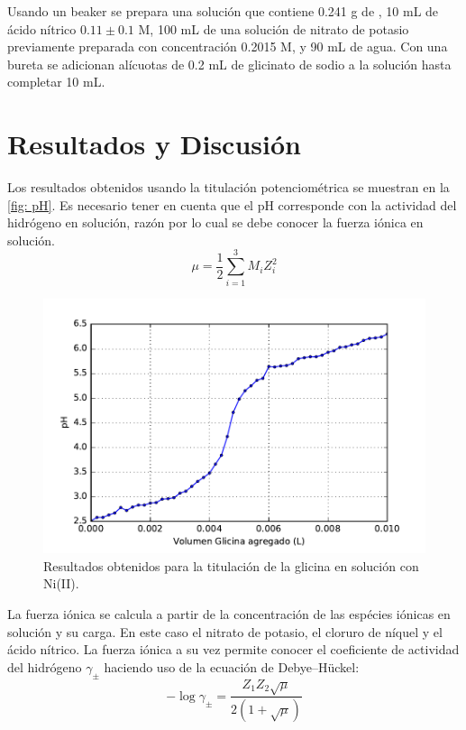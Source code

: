 \documentclass[fleqn,10pt]{SelfArx} %
\begin{document}
	Usando un beaker se prepara una soluci\'on que contiene 0.241 g de , 10 mL de \'acido n\'itrico $0.11\pm0.1$ M, 100 mL de una soluci\'on de nitrato de potasio previamente preparada con concentraci\'on 0.2015 M, y 90 mL de agua. Con una bureta se adicionan al\'icuotas de 0.2 mL de glicinato de sodio a la soluci\'on hasta completar 10 mL.
	
	\section{Resultados y Discusi\'on}
	
	Los resultados obtenidos usando la titulaci\'on potenciom\'etrica se muestran en la \autoref{fig: pH}. Es necesario tener en cuenta que el pH corresponde con la actividad del hidr\'ogeno en soluci\'on, raz\'on por lo cual se debe conocer la fuerza i\'onica en soluci\'on.
	\begin{equation}\label{eq: strength}
		\mu = \dfrac{1}{2}\sum\limits_{i=1}^{3} M_iZ_i^2
	\end{equation}
	\pagebreak
	
	\begin{figure}[h]
		\centering
		\includegraphics[width=\linewidth]{images/pH.pdf}
		\caption{Resultados obtenidos para la titulaci\'on de la glicina en soluci\'on con Ni(II).}
		\label{fig: pH}
	\end{figure}
	
	La fuerza i\'onica se calcula a partir de la concentraci\'on de las esp\'ecies i\'onicas en soluci\'on y su carga. En este caso el nitrato de potasio, el cloruro de n\'iquel y el \'acido n\'itrico. La fuerza i\'onica a su vez permite conocer el coeficiente de actividad del hidr\'ogeno $\gamma_\pm$ haciendo uso de la ecuaci\'on de Debye–H\"uckel:
	\begin{equation}\label{eq: activity}
		-\log\gamma_\pm = \dfrac{Z_1 Z_2 \sqrt{\mu}}{2\left(1+\sqrt{\mu}\right)}
	\end{equation}
	
\end{document}
